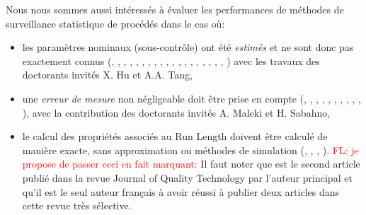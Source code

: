 Nous nous sommes aussi intéressés à évaluer les performances de
méthodes de surveillance statistique de procédés dans le cas où:
\begin{itemize}
\item les paramètres nominaux (sous-contrôle) ont été \emph{estimés}
  et ne sont donc pas exactement connus (\cite{chong:hal-01978769},
  \cite{tang:hal-02015138}, \cite{tang:hal-02145998},
  \cite{hu:hal-02155302}, \cite{hu:hal-02160997},
  \cite{castagliola:hal-02190734}, \cite{hu:hal-02318364},
  \cite{khoo:hal-02354567}, \cite{hu:hal-01835841},
  \cite{oprime:hal-01421764}, \cite{you:hal-01614074},
  \cite{teoh:hal-01583912}, \cite{hu:hal-01668745},
  \cite{wu:hal-01286478}, \cite{teoh:hal-01326056},
  \cite{castagliola:hal-01349529}, \cite{yeong:hal-01180304},
  \cite{teoh:hal-01185340}, \cite{you:hal-01216234},
  \cite{you:hal-01348052}) avec les travaux des doctorants invités
  X. Hu et A.A. Tang,
\item une \emph{erreur de mesure} non négligeable doit être prise en
  compte (\cite{sabahno:hal-01977765}, \cite{tang:hal-01978754},
  \cite{sabahno:hal-02190729}, \cite{tang:hal-01806538},
  \cite{sabahno:hal-01921390}, \cite{maleki:hal-01423386},
  \cite{tran:hal-01668732}, \cite{hu:hal-01307056},
  \cite{hu:hal-01327313}, \cite{hu:hal-01396018},
  \cite{hu:hal-01228430}), avec la contribution des doctorants invités
  A. Maleki et H. Sabahno,
\item le calcul des propriétés associés au Run Length doivent être
  calculé de manière exacte, sans approximation ou méthodes de
  simulation (\cite{castagliola:hal-02002980},
  \cite{maravelakis:hal-02022526}, \cite{tang:hal-02059892},
  \cite{khoo:hal-01354062}). 
  \textcolor{red}{FL: je propose de passer ceci en fait marquant:}
  Il faut noter que
  \cite{castagliola:hal-02002980} est le second article publié dans la
  revue Journal of Quality Technology par l'auteur principal et qu'il
  est le seul auteur français à avoir réussi à publier deux articles
  dans cette revue très sélective.
\end{itemize}

